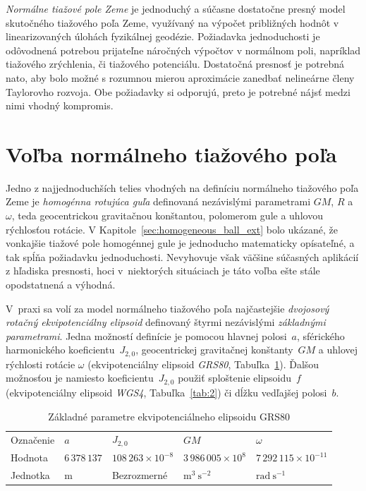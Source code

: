 \documentclass[a4paper, 12pt]{book}
\begin{document}
\emph{Normálne tiažové pole Zeme} je jednoduchý a súčasne dostatočne presný 
model skutočného tiažového poľa Zeme, využívaný na výpočet približných hodnôt 
v linearizovaných úlohách fyzikálnej geodézie.  Požiadavka jednoduchosti je 
odôvodnená potrebou prijateľne náročných výpočtov v normálnom poli, napríklad 
tiažového zrýchlenia, či tiažového potenciálu.  Dostatočná presnosť je potrebná 
nato, aby bolo možné s rozumnou mierou aproximácie zanedbať nelineárne členy 
Taylorovho rozvoja.  Obe požiadavky si odporujú, preto je potrebné nájsť medzi 
nimi vhodný kompromis.

\section{Voľba normálneho tiažového poľa}

Jedno z najjednoduchších telies vhodných na definíciu normálneho tiažového poľa 
Zeme je \emph{homogénna rotujúca guľa} definovaná nezávislými parametrami $GM$, 
$R$ a $\omega$, teda geocentrickou gravitačnou konštantou, polomerom gule 
a uhlovou rýchlosťou rotácie.  V Kapitole~\ref{sec:homogeneous_ball_ext} bolo 
ukázané, že vonkajšie tiažové pole homogénnej gule je jednoducho matematicky 
opísateľné, a tak spĺňa požiadavku jednoduchosti.  Nevyhovuje však väčšine 
súčasných aplikácií z hľadiska presnosti, hoci v~niektorých situáciach je táto 
voľba ešte stále opodstatnená a výhodná.

V~praxi sa volí za model normálneho tiažového poľa najčastejšie \emph{dvojosový 
rotačný ekvipotenciálny elipsoid} definovaný štyrmi nezávislými 
\emph{základnými parametrami}.  Jedna možností definície je pomocou hlavnej 
polosi~$a$, sférického harmonického koeficientu~$J_{2,0}$, geocentrickej 
gravitačnej konštanty~$GM$ a uhlovej rýchlosti rotácie $\omega$ 
(ekvipotenciálny elipsoid \emph{GRS80}, Tabuľka~\ref{tab:1}).  Ďalšou možnosťou 
je namiesto koeficientu~$J_{2,0}$ použiť sploštenie elipsoidu~$f$ 
(ekvipotenciálny elipsoid \emph{WGS4}, Tabuľka~\ref{tab:2}) či dĺžku vedľajšej 
polosi~$b$.


\begin{table}
\begin{center}
\caption{Základné parametre ekvipotenciálneho elipsoidu GRS80 \citep{GRS80}}
\label{tab:1}
\begin{tabular}{l l l l l}
\hline
Označenie & $a$ & $J_{2,0}$ & $GM$ & $\omega$\\
Hodnota   & $6\,378\,137$ & $108\,263 \times 10^{-8}$ & $3\,986\,005 \times 
10^8$ & $7\,292\,115 \times 10^{-11}$\\
Jednotka  & $\mathrm{m}$ & Bezrozmerné & $\mathrm{m}^3 \ \mathrm{s}^{-2}$ 
& $\mathrm{rad} \ \mathrm{s}^{-1}$\\
\hline
\end{tabular}
\end{center}
\end{table}
\end{document}
